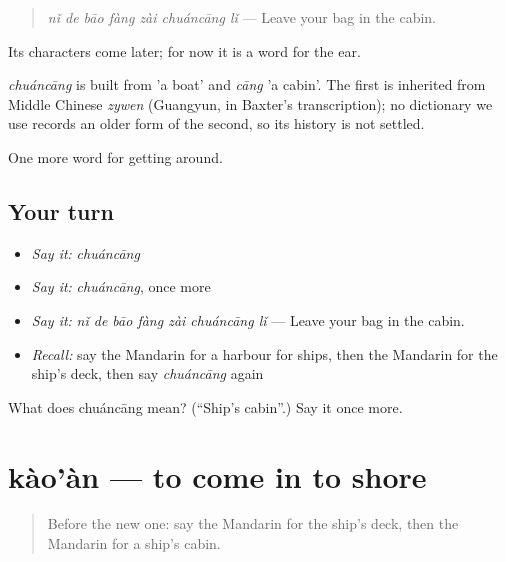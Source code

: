 \begin{quote}
\emph{nǐ de bāo fàng zài chuáncāng lǐ} — Leave your bag in the cabin.
\end{quote}

Its characters come later; for now it is a word for the ear.

\begin{cousinweb}
\emph{chuáncāng} is built from  'a boat' and \emph{cāng} 'a cabin'. The first is inherited from Middle Chinese \emph{zywen} (Guangyun, in Baxter's transcription); no dictionary we use records an older form of the second, so its history is not settled.
\end{cousinweb}

\begin{grammarlens}[title={What you've built}]
One more word for getting around.
\end{grammarlens}

\subsection*{Your turn}
\begin{itemize}
\raggedright
  \item \emph{Say it:} \emph{chuáncāng}
  \item \emph{Say it:} \emph{chuáncāng}, once more
  \item \emph{Say it:} \emph{nǐ de bāo fàng zài chuáncāng lǐ} — Leave your bag in the cabin.
  \item \emph{Recall:} say the Mandarin for a harbour for ships, then the Mandarin for the ship's deck, then say \emph{chuáncāng} again
\end{itemize}

\begin{tcolorbox}[breakable,colback=teal!4,colframe=teal!35!black,title={Before you move on}]
What does chuáncāng mean? (\textquotedblleft{}Ship's cabin\textquotedblright{}.) Say it once more.
\end{tcolorbox}
\section[kào'àn]{kào'àn — to come in to shore}

\label{lesson:ZH-C412-kaoan}



\begin{quote}
Before the new one: say the Mandarin for the ship's deck, then the Mandarin for a ship's cabin.
\end{quote}

